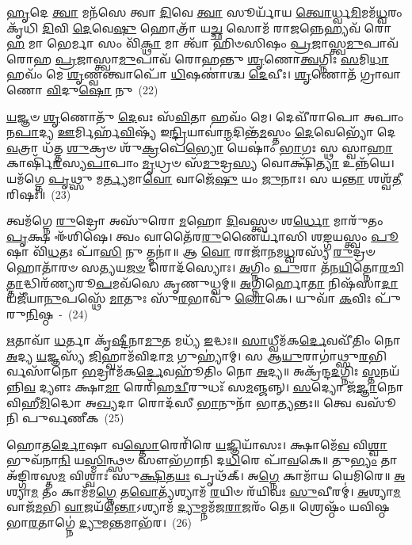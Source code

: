 {\anuvakamend[{\-\ul{𑌹}\-𑌵𑌿𑌷𑍍𑌮᳴\-\ul{𑌤𑍀}\-𑌶𑍍𑌚𑌤𑍁᳴𑌸𑍍𑌰𑌿𑍞𑌶𑌤𑍍}]}%

\-\ul{𑌹𑍃}\-𑌦𑍇 \ul{𑌤𑍍𑌵𑌾} 𑌮𑌨᳴𑌸𑍇 𑌤𑍍𑌵𑌾 \ul{𑌦𑌿}\-𑌵𑍇 \ul{𑌤𑍍𑌵𑌾} 𑌸𑍂𑌰𑍍𑌯𑌾᳴𑌯 \ul{𑌤𑍍𑌵𑍋}\-𑌰𑍍𑌧𑍍𑌵\-\ul{𑌮𑌿}\-𑌮𑌮᳴\-\ul{𑌧𑍍𑌵}\-𑌰𑌂 𑌕𑍃᳴𑌧𑌿 \ul{𑌦𑌿}\-𑌵𑌿 \ul{𑌦𑍇}\-𑌵𑍇\-\ul{𑌷𑍁} 𑌹𑍋𑌤𑍍𑌰𑌾᳴ 𑌯\-\ul{𑌚𑍍𑌛} 𑌸𑍋𑌮᳴ 𑌰𑌾\-\ul{𑌜}\-𑌨𑍍𑌨𑍇𑌹𑍍𑌯𑌵᳴ 𑌰𑍋\-\ul{𑌹} 𑌮𑌾 𑌭𑍇𑌰𑍍𑌮𑌾 𑌸𑌂 𑌵𑌿᳴\-\ul{𑌕𑍍𑌥𑌾} 𑌮𑌾 𑌤𑍍𑌵𑌾᳴ 𑌹𑌿𑍞𑌸𑌿𑌷𑌂 \ul{𑌪𑍍𑌰}\-𑌜𑌾𑌸𑍍𑌤𑍍𑌵\-\ul{𑌮𑍁}\-𑌪𑌾𑌵᳴𑌰𑍋𑌹 \ul{𑌪𑍍𑌰}\-𑌜𑌾𑌸𑍍𑌤𑍍𑌵𑌾\-\ul{𑌮𑍁}\-𑌪𑌾𑌵᳴ 𑌰𑍋𑌹𑌨𑍍𑌤𑍁 \ul{𑌶𑍃}\-𑌣𑍋\-\ul{𑌤𑍍𑌵}\-𑌗𑍍𑌨𑌿𑌃 \ul{𑌸}\-𑌮𑌿\-\ul{𑌧𑌾} 𑌹𑌵𑌂᳴ 𑌮𑍇 \ul{𑌶𑍃}\-𑌣𑍍𑌵𑌨𑍍𑌤𑍍𑌵𑌾𑌪𑍋᳴ \ul{𑌧𑌿}\-𑌷𑌣𑌾॑𑌶𑍍𑌚 \ul{𑌦𑍇}\-𑌵𑍀𑌃। \ul{𑌶𑍃}\-𑌣𑍋𑌤᳴ 𑌗𑍍𑌰𑌾𑌵𑌾𑌣𑍋 \ul{𑌵𑌿}\-𑌦𑍁\-\ul{𑌷𑍋} 𑌨𑍁~(22)

\-\ul{𑌯}\-𑌜𑍍𑌞𑍞 \ul{𑌶𑍃}\-𑌣𑍋𑌤𑍁᳴ \ul{𑌦𑍇}\-𑌵𑌃 𑌸᳴\-\ul{𑌵𑌿}\-𑌤𑌾 𑌹𑌵𑌂᳴ 𑌮𑍇। 𑌦𑍇𑌵𑍀᳴𑌰𑌾𑌪𑍋 𑌅𑌪𑌾𑌂 𑌨\-\ul{𑌪𑌾}\-𑌦𑍍𑌯 \ul{𑌊}\-𑌰𑍍𑌮𑌿𑌰𑍍\mbox{}𑌹᳴\-\ul{𑌵𑌿}\-𑌷𑍍𑌯᳴ 𑌇\-\ul{𑌨𑍍𑌦𑍍𑌰𑌿}\-𑌯𑌾𑌵𑌾॑\-\ul{𑌨𑍍𑌮}\-𑌦𑌿𑌨𑍍𑌤᳴\-\ul{𑌮}\-𑌸𑍍𑌤𑌂 \ul{𑌦𑍇}\-𑌵𑍇𑌭𑍍𑌯𑍋᳴ 𑌦𑍇\-\ul{𑌵}\-𑌤𑍍𑌰𑌾 𑌧᳴𑌤𑍍𑌤 \ul{𑌶𑍁}\-𑌕𑍍𑌰𑍞 𑌶𑍁᳴\-\ul{𑌕𑍍𑌰}\-𑌪𑍇\-\ul{𑌭𑍍𑌯𑍋} 𑌯𑍇𑌷𑌾𑌂॑ \ul{𑌭𑌾}\-𑌗𑌃 𑌸𑍍𑌥 𑌸𑍍𑌵𑌾\-\ul{𑌹𑌾} 𑌕𑌾𑌰𑍍\mbox{}𑌷𑌿᳴\-\ul{𑌰}\-𑌸𑍍𑌯\-\ul{𑌪𑌾}\-𑌪𑌾𑌂 \ul{𑌮𑍃}\-𑌧𑍍𑌰𑍞 𑌸᳴\-\ul{𑌮𑍁}\-𑌦𑍍𑌰\-\ul{𑌸𑍍𑌯} 𑌵𑍋𑌕𑍍𑌷𑌿᳴\-\ul{𑌤𑍍𑌯𑌾} 𑌉𑌨𑍍𑌨᳴𑌯𑍇। 𑌯𑌮᳴𑌗𑍍𑌨𑍇 \ul{𑌪𑍃}\-𑌥𑍍𑌸𑍁 𑌮\-\ul{𑌰𑍍𑌤𑍍𑌯}\-𑌮𑌾\-\ul{𑌵𑍋} 𑌵𑌾𑌜𑍇᳴\-\ul{𑌷𑍁} 𑌯𑌂 \ul{𑌜𑍁}\-𑌨𑌾𑌃। 𑌸 𑌯\-\ul{𑌨𑍍𑌤𑌾} 𑌶𑌶𑍍𑌵᳴\-\ul{𑌤𑍀}\-𑌰𑌿𑌷𑌃᳴॥~(23)

{\anuvakamend[{𑌨𑍁 \ul{𑌸}\-𑌪𑍍𑌤𑌚᳴𑌤𑍍𑌵𑌾𑌰𑌿𑍞𑌶𑌚𑍍𑌚}]}%

𑌤𑍍𑌵𑌮᳴𑌗𑍍𑌨𑍇 \ul{𑌰𑍁}\-𑌦𑍍𑌰𑍋 𑌅𑌸𑍁᳴𑌰𑍋 \ul{𑌮}\-𑌹𑍋 \ul{𑌦𑌿}\-𑌵𑌸𑍍𑌤𑍍𑌵𑍞 𑌶\-\ul{𑌰𑍍𑌧𑍋} 𑌮𑌾𑌰𑍁᳴𑌤𑌂 \ul{𑌪𑍃}\-𑌕𑍍𑌷 𑌈᳴𑌶𑌿𑌷𑍇। 𑌤𑍍𑌵𑌂 𑌵𑌾𑌤𑍈᳴𑌰\-\ul{𑌰𑍁}\-𑌣𑍈𑌰𑍍𑌯𑌾᳴𑌸𑌿 𑌶\-\ul{𑌙𑍍𑌗}\-𑌯𑌸𑍍𑌤𑍍𑌵𑌂 \ul{𑌪𑍂}\-𑌷𑌾 𑌵𑌿᳴\-\ul{𑌧}\-𑌤𑌃 𑌪𑌾᳴\-\ul{𑌸𑌿} 𑌨𑍁 𑌤𑍍𑌮𑌨𑌾॑॥ 𑌆 \ul{𑌵𑍋} 𑌰𑌾𑌜𑌾᳴𑌨𑌮\-\ul{𑌧𑍍𑌵}\-𑌰𑌸𑍍𑌯᳴ \ul{𑌰𑍁}\-𑌦𑍍𑌰𑍞 𑌹𑍋𑌤𑌾᳴𑌰𑍞 𑌸\-\ul{𑌤𑍍𑌯}\-𑌯\-\ul{𑌜}\-\-\ul{𑍞} 𑌰𑍋𑌦᳴𑌸𑍍𑌯𑍋𑌃। \ul{𑌅}\-𑌗𑍍𑌨𑌿𑌂 \ul{𑌪𑍁}\-𑌰𑌾 𑌤᳴𑌨\-\ul{𑌯𑌿}\-𑌤𑍍𑌨𑍋\-\ul{𑌰}\-𑌚𑌿\-\ul{𑌤𑍍𑌤𑌾}\-𑌦𑍍𑌧𑌿𑌰᳴𑌣𑍍𑌯𑌰𑍂\-\ul{𑌪}\-𑌮𑌵᳴𑌸𑍇 𑌕𑍃𑌣𑍁𑌧𑍍𑌵𑌮𑍍॥ \ul{𑌅}\-𑌗𑍍𑌨𑌿𑌰𑍍\mbox{}𑌹𑍋\-\ul{𑌤𑌾} 𑌨𑌿𑌷᳴𑌸𑌾\-\ul{𑌦𑌾} 𑌯𑌜𑍀᳴𑌯𑌾\-\ul{𑌨𑍁}\-𑌪𑌸𑍍𑌥𑍇᳴ \ul{𑌮𑌾}\-𑌤𑍁𑌃 𑌸𑍁᳴\-\ul{𑌰}\-𑌭𑌾𑌵𑍁᳴ \ul{𑌲𑍋}\-𑌕𑍇। 𑌯𑍁𑌵𑌾᳴ \ul{𑌕}\-𑌵𑌿𑌃 𑌪𑍁᳴𑌰𑍁\-\ul{𑌨𑌿}\-𑌷𑍍𑌠~-~(24)

\-\ul{𑌋}\-𑌤𑌾𑌵𑌾᳴ \ul{𑌧}\-𑌰𑍍𑌤𑌾 𑌕𑍃᳴\-\ul{𑌷𑍍𑌟𑍀}\-𑌨𑌾\-\ul{𑌮𑍁}\-𑌤 𑌮𑌧𑍍𑌯᳴ \ul{𑌇}\-𑌦𑍍𑌧𑌃॥ \ul{𑌸𑌾}\-𑌧𑍍𑌵𑍀𑌮᳴𑌕\-\ul{𑌰𑍍𑌦𑍇}\-𑌵𑌵𑍀᳴𑌤𑌿𑌂 𑌨𑍋 \ul{𑌅}\-𑌦𑍍𑌯 \ul{𑌯}\-𑌜𑍍𑌞𑌸𑍍𑌯᳴ \ul{𑌜𑌿}\-𑌹𑍍𑌵𑌾𑌮᳴𑌵𑌿𑌦𑌾\-\ul{𑌮} 𑌗𑍁𑌹𑍍𑌯𑌾॑𑌮𑍍। 𑌸 𑌆\-\ul{𑌯𑍁}\-𑌰𑌾𑌗𑌾॑𑌥𑍍𑌸𑍁\-\ul{𑌰}\-\-𑌭𑌿𑌰𑍍𑌵𑌸𑌾᳴𑌨𑍋 \ul{𑌭}\-𑌦𑍍𑌰𑌾𑌮᳴𑌕\-\ul{𑌰𑍍𑌦𑍇}\-𑌵𑌹𑍂᳴𑌤𑌿𑌂 𑌨𑍋 \ul{𑌅}\-𑌦𑍍𑌯॥ 𑌅𑌕𑍍𑌰᳴𑌨𑍍𑌦\-\ul{𑌦}\-𑌗𑍍𑌨𑌿𑌃 \ul{𑌸𑍍𑌤}\-𑌨𑌯᳴𑌨𑍍𑌨𑌿\-\ul{𑌵} 𑌦𑍍𑌯𑍗𑌃 𑌕𑍍𑌷𑌾\-\ul{𑌮𑌾} 𑌰𑍇𑌰𑌿᳴𑌹\-\ul{𑌦𑍍𑌵𑍀}\-𑌰𑍁𑌧𑌃᳴ 𑌸\-\ul{𑌮}\-𑌞𑍍𑌜𑌨𑍍𑌨𑍍। \ul{𑌸}\-𑌦𑍍𑌯𑍋 𑌜᳴\-\ul{𑌜𑍍𑌞𑌾}\-𑌨𑍋 𑌵𑌿𑌹𑍀\-\ul{𑌮𑌿}\-𑌦𑍍𑌧𑍋 𑌅\-\ul{𑌖𑍍𑌯}\-𑌦𑌾 𑌰𑍋𑌦᳴𑌸𑍀 \ul{𑌭𑌾}\-𑌨𑍁𑌨𑌾᳴ 𑌭𑌾\-\ul{𑌤𑍍𑌯}\-𑌨𑍍𑌤𑌃॥ 𑌤𑍍𑌵𑍇 𑌵𑌸𑍂᳴𑌨𑌿 𑌪𑍁𑌰𑍍𑌵𑌣𑍀𑌕~(25)

𑌹𑍋𑌤\-\ul{𑌰𑍍𑌦𑍋}\-𑌷𑌾 𑌵\-\ul{𑌸𑍍𑌤𑍋}\-𑌰𑍇𑌰𑌿᳴𑌰𑍇 \ul{𑌯}\-𑌜𑍍𑌞𑌿𑌯𑌾᳴𑌸𑌃। 𑌕𑍍𑌷𑌾𑌮𑍇᳴\-\ul{𑌵} 𑌵𑌿\-\ul{𑌶𑍍𑌵𑌾} 𑌭𑍁𑌵᳴𑌨𑌾\-\ul{𑌨𑌿} 𑌯\-\ul{𑌸𑍍𑌮𑌿}\-𑌨𑍍𑌥𑍍𑌸𑍞 𑌸𑍗𑌭᳴𑌗𑌾𑌨𑌿 𑌦\-\ul{𑌧𑌿}\-𑌰𑍇 𑌪𑌾᳴\-\ul{𑌵}\-𑌕𑍇॥ 𑌤𑍁\-\ul{𑌭𑍍𑌯𑌂} 𑌤𑌾 𑌅᳴𑌙𑍍𑌗𑌿𑌰𑌸𑍍𑌤\-\ul{𑌮} 𑌵𑌿𑌶𑍍𑌵𑌾𑌃॑ 𑌸𑍁\-\ul{𑌕𑍍𑌷𑌿}\-𑌤\-\ul{𑌯𑌃} 𑌪𑍃𑌥᳴𑌕𑍍। 𑌅\-\ul{𑌗𑍍𑌨𑍇} 𑌕𑌾𑌮𑌾᳴𑌯 𑌯𑍇𑌮𑌿𑌰𑍇॥ \ul{𑌅}\-𑌶𑍍𑌯𑌾\-\ul{𑌮} 𑌤𑌂 𑌕𑌾𑌮᳴𑌮\-\ul{𑌗𑍍𑌨𑍇} 𑌤\-\ul{𑌵𑍋}\-𑌤𑍍𑌯᳴𑌶𑍍𑌯𑌾𑌮᳴ \ul{𑌰}\-𑌯𑌿𑍞 𑌰᳴𑌯𑌿𑌵𑌃 \ul{𑌸𑍁}\-𑌵𑍀𑌰𑌮𑍍॑। \ul{𑌅}\-𑌶𑍍𑌯𑌾\-\ul{𑌮} 𑌵𑌾𑌜᳴\-\ul{𑌮}\-𑌭𑌿 \ul{𑌵𑌾}\-𑌜𑌯᳴\-\ul{𑌨𑍍𑌤𑍋}\-\-𑌽𑌶𑍍𑌯𑌾𑌮᳴ \ul{𑌦𑍍𑌯𑍁}\-𑌮𑍍𑌨𑌮᳴𑌜\-\ul{𑌰𑌾}\-𑌜𑌰𑌂᳴ 𑌤𑍇॥ 𑌶𑍍𑌰𑍇𑌷𑍍𑌠𑌂᳴ 𑌯𑌵𑌿𑌷𑍍𑌠 𑌭𑌾\-\ul{𑌰}\-𑌤𑌾𑌗𑍍𑌨𑍇॑ \ul{𑌦𑍍𑌯𑍁}\-𑌮\-\ul{𑌨𑍍𑌤}\-𑌮𑌾𑌭᳴𑌰।~(26)

